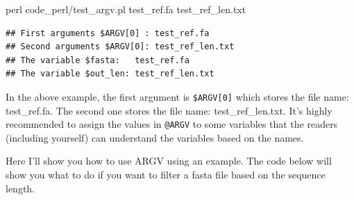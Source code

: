\documentclass[]{book}
\makeatletter
\newenvironment{Shaded}{\begin{snugshade}}{\end{snugshade}}
\newcommand{\FunctionTok}[1]{\textcolor[rgb]{0.00,0.00,0.00}{#1}}
\newcommand{\NormalTok}[1]{#1}
\newenvironment{kframe}{%
\medskip{}
\setlength{\fboxsep}{.8em}
 \def\at@end@of@kframe{}%
 \ifinner\ifhmode%
  \def\at@end@of@kframe{\end{minipage}}%
  \begin{minipage}{\columnwidth}%
 \fi\fi%
 \def\FrameCommand##1{\hskip\@totalleftmargin \hskip-\fboxsep
 \colorbox{shadecolor}{##1}\hskip-\fboxsep
     \hskip-\linewidth \hskip-\@totalleftmargin \hskip\columnwidth}%
 \MakeFramed {\advance\hsize-\width
   \@totalleftmargin\z@ \linewidth\hsize
   \@setminipage}}%
 {\par\unskip\endMakeFramed%
 \at@end@of@kframe}
\renewenvironment{Shaded}{\begin{kframe}}{\end{kframe}}
\makeatother
\begin{document}
\begin{Shaded}
\begin{Highlighting}[]
\FunctionTok{perl}\NormalTok{ code_perl/test_argv.pl test_ref.fa test_ref_len.txt}
\end{Highlighting}
\end{Shaded}

\begin{verbatim}
## First arguments $ARGV[0] : test_ref.fa
## Second arguments $ARGV[0]: test_ref_len.txt
## The variable $fasta:   test_ref.fa
## The variable $out_len: test_ref_len.txt
\end{verbatim}

In the above example, the first argument is \texttt{\$ARGV{[}0{]}} which stores the file name: test\_ref.fa. The second one stores the file name: test\_ref\_len.txt. It's highly recommended to assign the values in \texttt{@ARGV} to some variables that the readers (including yourself) can understand the variables based on the names.

Here I'll show you how to use ARGV using an example. The code below will show you what to do if you want to filter a fasta file based on the sequence length.
\end{document}
